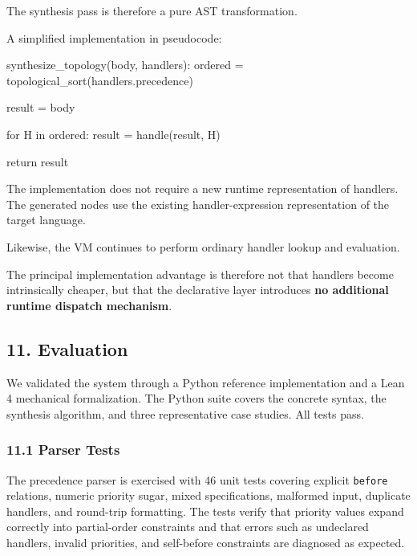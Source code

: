 \documentclass[
  11pt,
]{article}
\newenvironment{Shaded}{}{}
\newcommand{\NormalTok}[1]{#1}
\begin{document}
The synthesis pass is therefore a pure AST transformation.

A simplified implementation in pseudocode:

\begin{Shaded}
\begin{Highlighting}[]
\NormalTok{synthesize\_topology(body, handlers):}
\NormalTok{    ordered = topological\_sort(handlers.precedence)}

\NormalTok{    result = body}

\NormalTok{    for H in ordered:}
\NormalTok{        result = handle(result, H)}

\NormalTok{    return result}
\end{Highlighting}
\end{Shaded}

The implementation does not require a new runtime representation of
handlers. The generated nodes use the existing handler-expression
representation of the target language.

Likewise, the VM continues to perform ordinary handler lookup and
evaluation.

The principal implementation advantage is therefore not that handlers
become intrinsically cheaper, but that the declarative layer introduces
\textbf{no additional runtime dispatch mechanism}.

\subsection{11. Evaluation}\label{evaluation}

We validated the system through a Python reference implementation and a
Lean 4 mechanical formalization. The Python suite covers the concrete
syntax, the synthesis algorithm, and three representative case studies.
All tests pass.

\subsubsection{11.1 Parser Tests}\label{parser-tests}

The precedence parser is exercised with 46 unit tests covering explicit
\texttt{before} relations, numeric priority sugar, mixed specifications,
malformed input, duplicate handlers, and round-trip formatting. The
tests verify that priority values expand correctly into partial-order
constraints and that errors such as undeclared handlers, invalid
priorities, and self-before constraints are diagnosed as expected.
\end{document}
